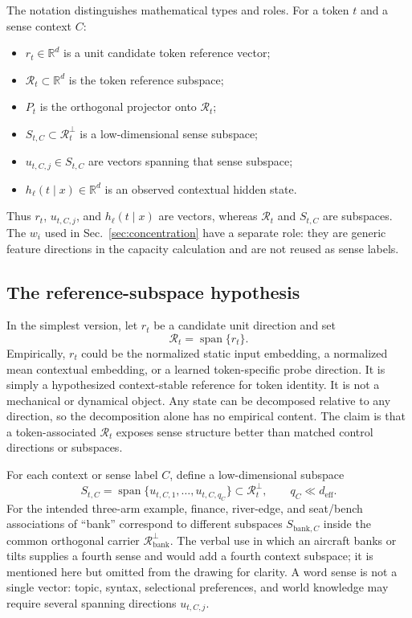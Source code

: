\documentclass[
  aps,
  reprint,
  superscriptaddress,
  floatfix,
  nofootinbib,
  longbibliography
]{revtex4-2}
\newcommand{\R}{\mathbb{R}}
\newcommand{\deff}{d_{\mathrm{eff}}}
\DeclareMathOperator{\spanop}{span}
\begin{document}
The notation distinguishes mathematical types and roles. For a token $t$
and a sense context $C$:
%
\begin{itemize}
\item $r_t\in\R^d$ is a unit candidate token reference vector;
\item $\mathcal R_t\subset\R^d$ is the token reference subspace;
\item $P_t$ is the orthogonal projector onto $\mathcal R_t$;
\item $S_{t,C}\subset\mathcal R_t^\perp$ is a low-dimensional sense
subspace;
\item $u_{t,C,j}\in S_{t,C}$ are vectors spanning that sense subspace;
\item $h_\ell(t\mid x)\in\R^d$ is an observed contextual hidden state.
\end{itemize}
%
Thus $r_t$, $u_{t,C,j}$, and $h_\ell(t\mid x)$ are vectors, whereas
$\mathcal R_t$ and $S_{t,C}$ are subspaces. The $w_i$ used in
Sec.~\ref{sec:concentration} have a separate role: they are generic feature
directions in the capacity calculation and are not reused as sense labels.

\subsection{The reference-subspace hypothesis}
\label{sec:reference-hypothesis}

In the simplest version, let $r_t$ be a candidate unit direction and set
%
\begin{equation}
\label{eq:reference-direction}
\mathcal R_t=\spanop\{r_t\}.
\end{equation}
%
Empirically, $r_t$ could be the normalized static input embedding, a
normalized mean contextual embedding, or a learned token-specific probe
direction. It is simply a hypothesized context-stable reference for token
identity. It is not a mechanical or dynamical object.
Any state can be decomposed relative to any direction, so the decomposition
alone has no empirical content. The claim is that a token-associated
$\mathcal R_t$ exposes sense structure better than matched control
directions or subspaces.

For each context or sense label $C$, define a low-dimensional subspace
%
\begin{equation}
\label{eq:sense-subspace}
S_{t,C}=\spanop\{u_{t,C,1},\dots,u_{t,C,q_C}\}
\subset\mathcal R_t^\perp,
\qquad q_C\ll\deff .
\end{equation}
%
For the intended three-arm example, finance, river-edge, and seat/bench
associations of ``bank'' correspond to different subspaces
$S_{\mathrm{bank},C}$ inside the common orthogonal carrier
$\mathcal R_{\mathrm{bank}}^\perp$.  The verbal use in which an aircraft
banks or tilts supplies a fourth sense and would add a fourth context
subspace; it is mentioned here but omitted from the drawing for clarity.  A
word sense is not a single vector: topic, syntax, selectional preferences,
and world knowledge may require several spanning directions $u_{t,C,j}$.
\end{document}
